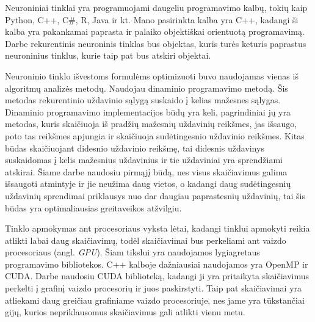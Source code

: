 Neuroniniai tinklai yra programuojami daugeliu programavimo kalbų, tokių kaip Python, C++, C\#, R, Java ir kt. Mano pasirinkta kalba yra C++, kadangi ši kalba yra pakankamai paprasta ir palaiko objektiškai orientuotą programavimą. Darbe rekurentinis neuroninis tinklas bus objektas, kuris turės keturis paprastus neuroninius tinklus, kurie taip pat bus atskiri objektai.

Neuroninio tinklo išvestoms formulėms optimizuoti buvo naudojamas vienas iš algoritmų analizės metodų. Naudojau dinaminio programavimo metodą. Šis metodas rekurentinio uždavinio sąlygą suskaido į kelias mažesnes sąlygas. Dinaminio programavimo implementacijos būdų yra keli, pagrindiniai jų yra metodas, kuris skaičiuoja iš pradžių mažesnių uždavinių reikšmes, jas išsaugo, poto tas reikšmes apjungia ir skaičiuoja sudėtingesnio uždavinio reikšmes. Kitas būdas skaičiuojant didesnio uždavinio reikšmę, tai didesnis uždavinys suskaidomas į kelis mažesnius uždavinius ir tie uždaviniai yra sprendžiami atskirai. Šiame darbe naudosiu pirmąjį būdą, nes visus skaičiavimus galima išsaugoti atmintyje ir jie neužima daug vietos, o kadangi daug sudėtingesnių uždavinių sprendimai priklausys nuo dar daugiau paprastesnių uždavinių, tai šis būdas yra optimaliausias greitaveikos atžvilgiu. \cite{Robinett2005}

Tinklo apmokymas ant procesoriaus vyksta lėtai, kadangi tinklui apmokyti reikia atlikti labai daug skaičiavimų, todėl skaičiavimai bus perkeliami ant vaizdo procesoriaus (angl. \textit{GPU}). Šiam tikslui yra naudojamos lygiagretaus programavimo bibliotekos. C++ kalboje dažniausiai naudojamos yra OpenMP ir CUDA. Darbe naudosiu CUDA biblioteką, kadangi ji yra pritaikyta skaičiavimus perkelti į grafinį vaizdo procesorių ir juos paskirstyti. Taip pat skaičiavimai yra atliekami daug greičiau grafiniame vaizdo procesoriuje, nes jame yra tūkstančiai gijų, kurios nepriklausomus skaičiavimus gali atlikti vienu metu. \cite{Fazlul2014}



%
%
%
%
%
%
%
%
%
%
%
%
%
%
%
%
%


%
%
%
%
%
%
%
%
%
%
